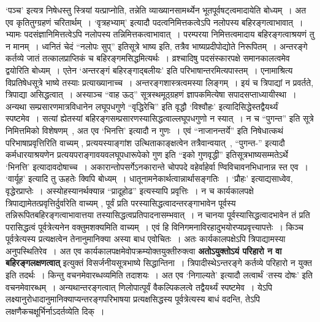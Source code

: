 `पञ्च' इत्यत्र निषेधस्तु स्त्रियां यत्प्राप्नोति, तन्नेति व्याख्यानसामर्थ्येन भूतपूर्वषट्‍त्वमादायेति बोध्यम्~।
अत एव कृतितुग्ग्रहणं चरितार्थम्~।
`वृत्रहभ्याम्' इत्यादौ पदत्वनिमित्तकत्वेऽपि नलोपस्य बहिरङ्गत्वाभावात्~।
भ्यामः पदसंज्ञानिमित्तत्वेऽपि नलोपस्य तन्निमित्तकत्वाभावात्~।
परम्परया निमित्तत्वमादाय बहिरङ्गत्वाश्रयणं तु न मानम्~।
ध्वनितं चेदं ``नलोपः सुप्'' इतिसूत्रे भाष्य इति, तत्रैव भाष्यप्रदीपोद्योते निरूपितम्~।
अन्तरङ्गे कर्तव्ये जातं तत्कालप्राप्तिकं च बहिरङ्गमसिद्धमित्यर्थः~।
व्रश्चादिषु पदसंस्कारपक्षे समानकालत्वमेव द्वयोरिति बोध्यम्~।
एतेन `अन्तरङ्गं बहिरङ्गाद्बलीयः' इति परिभाषान्तरमित्यपास्तम्~।
एनामाश्रित्य विप्रतिषेधसूत्रे भाष्ये तस्याः प्रत्याख्यानाच्च~।
अन्तरङ्गशास्त्रत्वमस्या लिङ्गम्~।
इयं च त्रिपाद्यां न प्रवर्तते, त्रिपाद्या असिद्धत्वात्~।
अस्याञ्च ``वाह ऊठ्'' सूत्रस्थमूठ्ग्रहणं ज्ञापकमित्येषा सपादसप्ताध्यायीस्था~।
अन्यथा सम्प्रसारणमात्रविधानेन लघूपधगुणे ``वृद्धिरेचि'' इति वृद्धौ `विश्वौहः' इत्यादिसिद्धेस्तद्वैयर्थ्यं स्पष्टमेव~।
सत्यां ह्येतस्यां बहिरङ्गसम्प्रसारणस्यासिद्धत्वाल्लघूपधगुणो न स्यात्~।
न च ``पुगन्त'' इति सूत्रे निमित्तमिको विशेषणम्~, अत एव `भिनत्ति' इत्यादौ न गुणः~।
एवं ``नाजानन्तर्ये'' इति निषेधात्कथं परिभाषाप्रवृत्तिरिति वाच्यम् , प्रत्ययस्याङ्गांश उत्थिताकाङ्क्षत्वेन तत्रैवान्वयात्~, ``पुगन्त-'' इत्यादौ कर्मधारयाश्रयणेन प्रत्ययपराङ्गावयवलघूपधारूपेको गुण इति ``इको गुणवृद्धी'' इतिसूत्रभाष्यसम्मतेऽर्थे `भिनत्ति' इत्यादावदोषाच्च~।
अकारान्तोपसर्गेऽनकारान्ते चोपपदे वहेर्वाहेर्वा ण्विविचावनभिधानान्न स्त एव~।
`वार्यूह' इत्यादि तु ऊहतेः क्विपि बोध्यम्~।
धातूनामनेकार्थत्वान्नार्थासङ्गतिः~।
`प्रौहः' इत्याद्यसाध्वेव, वृद्धेरप्राप्तेः~।
अस्योहस्यानर्थक्यान्न ``प्रादूहोढ'' इत्यस्यापि प्रवृत्तिः~।
न च कार्यकालपक्षे त्रिपाद्यामेतत्प्रवृत्तिर्दुर्वारेति वाच्यम् , पूर्वं प्रति परस्यासिद्धत्वादन्तरङ्गाभावेन पूर्वस्य तन्निरूपितबहिरङ्गत्वाभावात्तया तस्यासिद्धत्वप्रतिपादनासम्भवात्~।
न चानया पूर्वस्यासिद्धत्वादभावेन तं प्रति परासिद्धत्वं पूर्वत्रेत्यनेन वक्तुमशक्यमिति वाच्यम्~।
एवं हि विनिगमनाविरहादुभयोरप्यप्रवृत्त्यापत्तेः~।
किञ्च पूर्वत्रेत्यस्य प्रत्यक्षत्वेन तेनानुमानिक्या अस्या बाध एवोचितः~।
अतः कार्यकालपक्षेऽपि त्रिपाद्यामस्या अनुपस्थितिरेव~।
अत एव कार्यकालपक्षमेवोपक्रम्योक्तयुक्तीरुक्त्वा {\bfseries अतोऽयुक्तोऽयं परिहारो न वा बहिरङ्गलक्षणत्वात्} इत्युक्तं विसर्जनीयसूत्रभाष्ये सिद्धान्तिना~।
त्रिपादीस्थेऽन्तरङ्गे कर्तव्ये परिहारो न युक्त इति तदर्थः~।
किन्तु वचनमेवारब्धव्यमिति तदाशयः~।
अत एव `निगाल्यते' इत्यादौ लत्वार्थं `तस्य दोषः' इति वचनमेवारब्धम्~।
अन्यथान्तरङ्गत्वात् णिलोपात्पूर्वं वैकल्पिकलत्वे तद्वैयर्थ्यं स्पष्टमेव~।
येऽपि लक्ष्यानुरोधादानुमानिक्याप्यन्तरङ्गपरिभाषया प्रत्यक्षसिद्धस्य पूर्वत्रेत्यस्य बाधं वदन्ति, तेऽपि लक्षणैकचक्षूर्भिर्नाऽदर्तव्येति दिक्~।

